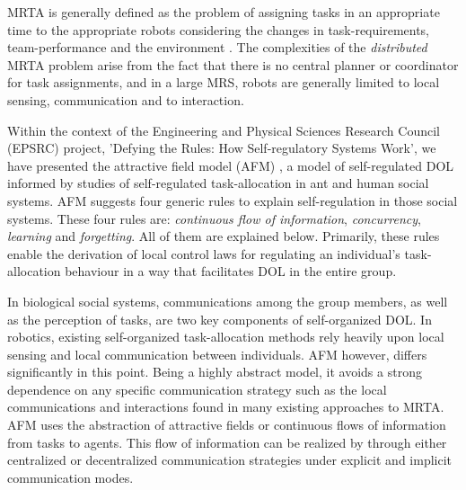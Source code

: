 \documentclass[journal]{IEEEtran}
\begin{document}
MRTA is generally defined as the problem of assigning tasks in an appropriate time to the appropriate robots considering the changes in task-requirements, team-performance and the environment \cite{Gerkey+2003}. %
The complexities of the {\em distributed} MRTA problem arise from the fact that there is no central planner or coordinator for task assignments, and in a large \acl{MRS}, robots are generally limited to local sensing, communication and to interaction. %



Within the context of the Engineering and Physical Sciences Research Council (EPSRC) project, 'Defying the Rules: How Self-regulatory Systems Work', we have presented the attractive field model (AFM) \cite{Arcaute+2008}, a model of self-regulated DOL  informed by studies of self-regulated task-allocation in ant and human social systems. AFM suggests four generic rules to explain self-regulation in those social systems. These four rules are: \textit{continuous flow of information}, \textit{concurrency}, \textit{learning} and \textit{forgetting}.  All of them are explained below. Primarily, these rules enable the derivation of local control laws for regulating an individual's task-allocation behaviour in a way that facilitates DOL in the entire group.

In biological social systems, communications among the group members, as well as the perception of tasks, are two key components of self-organized DOL. In robotics, existing self-organized task-allocation methods rely heavily upon local sensing and local communication between individuals. AFM however, differs significantly in this point.  Being a highly abstract model, it avoids a strong dependence on any specific communication strategy such as the local communications and interactions found in many existing approaches to MRTA. AFM uses the abstraction of attractive fields or continuous flows of information from tasks to agents.  This flow of information can be realized by through either centralized or decentralized communication strategies under explicit and implicit communication modes.
\end{document}
